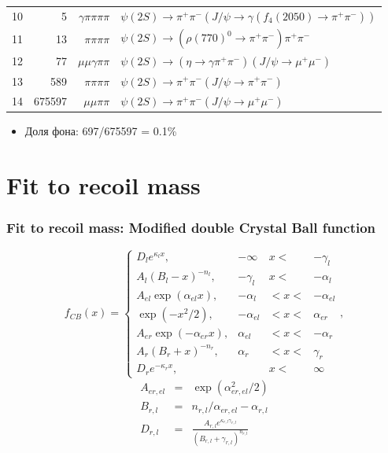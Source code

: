 \documentclass[unicode]{beamer}
\newcommand{\uu}{\mu^{+}\mu^{-}}
\newcommand{\pipi}{\pi^{+}\pi^{-}}
\begin{document}
\begin{frame}
\begin{table}
\begin{tabular}{rrrl}
 10&        5 &$ \gamma\pi\pi\pi\pi        $ &$ \psi(2S) \to \pipi(J/\psi \to \gamma(f_4(2050) \to \pipi))       $\\ 
 11&       13 &$ \pi\pi\pi\pi              $ &$ \psi(2S) \to (\rho(770)^0 \to \pipi)\pipi                 $\\ 
 12&       77 &$ \mu\mu\gamma \pi\pi       $ &$ \psi(2S) \to (\eta \to \gamma\pipi)(J/\psi \to \uu)              $\\ 
 13&      589 &$ \pi\pi\pi\pi              $ &$ \psi(2S) \to \pipi(J/\psi \to \pipi)                     $\\ 
 14&   675597 &$ \mu\mu\pi\pi              $ &$ \psi(2S) \to \pipi(J/\psi \to \uu)                     $\\ \hline
 \end{tabular}
 \end{table}
 \begin{itemize}
	 \item Доля фона: 697/675597 = 0.1\%
	 \end{itemize}
\end{frame}


\section{Fit to recoil mass}
\begin{frame}
	\frametitle{Fit to recoil mass: Modified double Crystal Ball function }
\begin{equation}
	f_{CB}(x)  = 	\left\{
		\begin{array}{lrrr}
			D_l e^{\kappa_l x},  &         -\infty   &   x < & -\gamma_l \\
			A_l(B_l - x)^{-n_l},  & -\gamma_l &   x <&   -\alpha_l \\
			A_{el}\exp(\alpha_{el}x), &  -\alpha_l & < x  < &-\alpha_{el} \\
			\exp( - x^2/2),  &  - \alpha_{el} & < x < & \alpha_{er} \\
			A_{er}\exp(-\alpha_{er}x), &  \alpha_{el} & < x < & -\alpha_{r} \\
			A_r(B_r + x)^{-n_r}, &   \alpha_r & < x < & \gamma_r \\
			D_r e^{-\kappa_r x},  &            &   x < & \infty
		\end{array}
		\right., 
\end{equation}
\begin{equation}
	\begin{array}{lcl}
		A_{er, el} & = &  \exp(\alpha_{er, el}^2/2) \\
		B_{ r, l}  &  = & n_{r, l}/ \alpha_{er, el} - \alpha_{r, l} \\
		D_{r, l}   &  = &  \frac{A_{r, l} e^{\kappa_{r, l}\gamma_{r, l}}}{(B_{r, l} + \gamma_{r, l})^{n_{r, l}}}
	\end{array}
\end{equation}
\end{frame}
\end{document}
